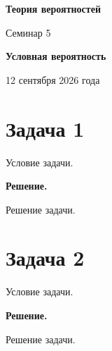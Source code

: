 \documentclass[a4paper,12pt]{article}
\begin{document}
\begin{center}
    {\Large\bfseries Теория вероятностей}

    \vspace{0.3em}

    {\large Семинар 5}

    \vspace{0.3em}

    \textbf{Условная вероятность}

    \vspace{0.3em}

    {\small 12 сентября 2026 года}
\end{center}

\vspace{1em}

\section*{Задача 1}

Условие задачи.

\textbf{Решение.}

Решение задачи.


\section*{Задача 2}

Условие задачи.

\textbf{Решение.}

Решение задачи.
\end{document}
